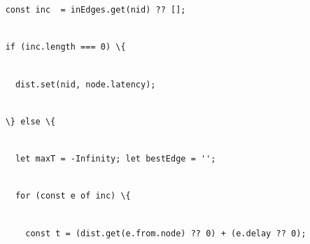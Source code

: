 \documentclass[
]{article}
\newcommand{\passthrough}[1]{#1}
\begin{document}
\passthrough{\lstinline!    !}\passthrough{\lstinline!const!}\passthrough{\lstinline! !}\passthrough{\lstinline!inc!}\passthrough{\lstinline!  !}\passthrough{\lstinline!=!}\passthrough{\lstinline! !}\passthrough{\lstinline!inEdges.get!}\passthrough{\lstinline!(!}\passthrough{\lstinline!nid!}\passthrough{\lstinline!)!}\passthrough{\lstinline! !}\passthrough{\lstinline!??!}\passthrough{\lstinline! !}\passthrough{\lstinline![];!}\strut \\
\passthrough{\lstinline!    !}\passthrough{\lstinline!if!}\passthrough{\lstinline! !}\passthrough{\lstinline!(!}\passthrough{\lstinline!inc.length!}\passthrough{\lstinline! !}\passthrough{\lstinline!===!}\passthrough{\lstinline! !}\passthrough{\lstinline!0)!}\passthrough{\lstinline! !}\passthrough{\lstinline!\{!}\strut \\
\passthrough{\lstinline!      !}\passthrough{\lstinline!dist.set!}\passthrough{\lstinline!(!}\passthrough{\lstinline!nid!}\passthrough{\lstinline!,!}\passthrough{\lstinline! !}\passthrough{\lstinline!node.latency!}\passthrough{\lstinline!);!}\strut \\
\passthrough{\lstinline!    !}\passthrough{\lstinline!\}!}\passthrough{\lstinline! !}\passthrough{\lstinline!else!}\passthrough{\lstinline! !}\passthrough{\lstinline!\{!}\strut \\
\passthrough{\lstinline!      !}\passthrough{\lstinline!let!}\passthrough{\lstinline! !}\passthrough{\lstinline!maxT!}\passthrough{\lstinline! !}\passthrough{\lstinline!=!}\passthrough{\lstinline! !}\passthrough{\lstinline!-Infinity;!}\passthrough{\lstinline! !}\passthrough{\lstinline!let!}\passthrough{\lstinline! !}\passthrough{\lstinline!bestEdge!}\passthrough{\lstinline! !}\passthrough{\lstinline!=!}\passthrough{\lstinline! !}\passthrough{\lstinline!'';!}\strut \\
\passthrough{\lstinline!      !}\passthrough{\lstinline!for!}\passthrough{\lstinline! !}\passthrough{\lstinline!(const!}\passthrough{\lstinline! !}\passthrough{\lstinline!e!}\passthrough{\lstinline! !}\passthrough{\lstinline!of!}\passthrough{\lstinline! !}\passthrough{\lstinline!inc!}\passthrough{\lstinline!)!}\passthrough{\lstinline! !}\passthrough{\lstinline!\{!}\strut \\
\passthrough{\lstinline!        !}\passthrough{\lstinline!const!}\passthrough{\lstinline! !}\passthrough{\lstinline!t!}\passthrough{\lstinline! !}\passthrough{\lstinline!=!}\passthrough{\lstinline! !}\passthrough{\lstinline!(!}\passthrough{\lstinline!dist.get!}\passthrough{\lstinline!(!}\passthrough{\lstinline!e.from.node!}\passthrough{\lstinline!)!}\passthrough{\lstinline! !}\passthrough{\lstinline!??!}\passthrough{\lstinline! !}\passthrough{\lstinline!0)!}\passthrough{\lstinline! !}\passthrough{\lstinline!+!}\passthrough{\lstinline! !}\passthrough{\lstinline!(!}\passthrough{\lstinline!e.delay!}\passthrough{\lstinline! !}\passthrough{\lstinline!??!}\passthrough{\lstinline! !}\passthrough{\lstinline!0);!}\strut \\
\end{document}
